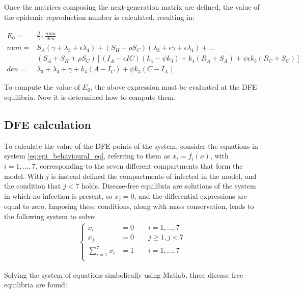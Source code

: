 Once the matrices composing the next-generation matrix are defined, the value of the epidemic reproduction number is calculated, resulting in:

\begin{equation}
	\begin{split}
		E_0 = &\frac{\beta}{\gamma} \cdot \frac{num}{den} \\
		num = &S_A(\gamma+\lambda_3+\epsilon \lambda_4)+ (S_H + \rho S_C)(\lambda_3+\epsilon \gamma+\epsilon \lambda_4) + ...\\
		& (S_A + S_H + \rho S_C)[(I_A-\epsilon IC)(k_4 - \psi k_3)+k_4(R_A+S_A)+\psi \epsilon k_3 (R_C+S_C)]\\
		den = &\lambda_3+\lambda_4+\gamma+k_4(A-I_C)+\psi k_3 (C-I_A)
	\end{split}
	\label{eq:epidemic_reproduction _number}
\end{equation}

To compute the value of $E_0$, the above expression must be evaluated at the DFE equilibria. Now it is determined how to compute them.

\subsection{DFE calculation}
To calculate the value of the DFE points of the system, consider the equations in system \eqref{eq:epi_behavioural_eq}, referring to them as $\dot{x_i} = f_i(x)$, with $i = 1,\dots,7$, corresponding to the seven different compartments that form the model. With $j$ is instead defined the compartments of infected in the model, and the condition that $j < 7$ holds.
Disease-free equilibria are solutions of the system in which no infection is present, so $x_j = 0$, and the differential expressions are equal to zero. Imposing these conditions, along with mass conservation, leads to the following system to solve:
\begin{align*}
	\begin{cases} 
		\dot{x_i} &= 0  \quad \quad   i = 1,...,7\\
		x_j &= 0	\quad \quad	 j \ge 1, j <7	\\
		\sum_{i = 1}^{7} x_i &= 1 \quad \quad i = 1,...,7 \\
	\end{cases}
	\label{eq:epi_behavioural_eq2}
\end{align*}

Solving the system of equations simbolically using Matlab, three disease free equilibria are found:

